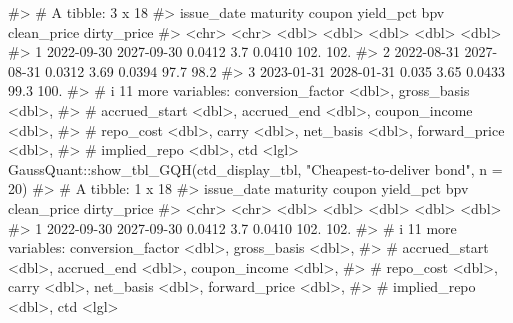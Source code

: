 \documentclass[
  letterpaper,
  DIV=11,
  numbers=noendperiod]{scrreprt}
\newenvironment{Shaded}{\begin{snugshade}}{\end{snugshade}}
\newcommand{\AttributeTok}[1]{\textcolor[rgb]{0.40,0.45,0.13}{#1}}
\newcommand{\CommentTok}[1]{\textcolor[rgb]{0.37,0.37,0.37}{#1}}
\newcommand{\DecValTok}[1]{\textcolor[rgb]{0.68,0.00,0.00}{#1}}
\newcommand{\FunctionTok}[1]{\textcolor[rgb]{0.28,0.35,0.67}{#1}}
\newcommand{\NormalTok}[1]{\textcolor[rgb]{0.00,0.23,0.31}{#1}}
\newcommand{\SpecialCharTok}[1]{\textcolor[rgb]{0.37,0.37,0.37}{#1}}
\newcommand{\StringTok}[1]{\textcolor[rgb]{0.13,0.47,0.30}{#1}}
\begin{document}
\begin{Shaded}
\begin{Highlighting}[]
\CommentTok{\#\textgreater{} \# A tibble: 3 x 18}
\CommentTok{\#\textgreater{}   issue\_date maturity   coupon yield\_pct    bpv clean\_price dirty\_price}
\CommentTok{\#\textgreater{}   \textless{}chr\textgreater{}      \textless{}chr\textgreater{}       \textless{}dbl\textgreater{}     \textless{}dbl\textgreater{}  \textless{}dbl\textgreater{}       \textless{}dbl\textgreater{}       \textless{}dbl\textgreater{}}
\CommentTok{\#\textgreater{} 1 2022{-}09{-}30 2027{-}09{-}30 0.0412      3.7  0.0410       102.        102. }
\CommentTok{\#\textgreater{} 2 2022{-}08{-}31 2027{-}08{-}31 0.0312      3.69 0.0394        97.7        98.2}
\CommentTok{\#\textgreater{} 3 2023{-}01{-}31 2028{-}01{-}31 0.035       3.65 0.0433        99.3       100. }
\CommentTok{\#\textgreater{} \# i 11 more variables: conversion\_factor \textless{}dbl\textgreater{}, gross\_basis \textless{}dbl\textgreater{},}
\CommentTok{\#\textgreater{} \#   accrued\_start \textless{}dbl\textgreater{}, accrued\_end \textless{}dbl\textgreater{}, coupon\_income \textless{}dbl\textgreater{},}
\CommentTok{\#\textgreater{} \#   repo\_cost \textless{}dbl\textgreater{}, carry \textless{}dbl\textgreater{}, net\_basis \textless{}dbl\textgreater{}, forward\_price \textless{}dbl\textgreater{},}
\CommentTok{\#\textgreater{} \#   implied\_repo \textless{}dbl\textgreater{}, ctd \textless{}lgl\textgreater{}}
\NormalTok{GaussQuant}\SpecialCharTok{::}\FunctionTok{show\_tbl\_GQH}\NormalTok{(ctd\_display\_tbl, }\StringTok{"Cheapest{-}to{-}deliver bond"}\NormalTok{, }\AttributeTok{n =} \DecValTok{20}\NormalTok{)}
\CommentTok{\#\textgreater{} \# A tibble: 1 x 18}
\CommentTok{\#\textgreater{}   issue\_date maturity   coupon yield\_pct    bpv clean\_price dirty\_price}
\CommentTok{\#\textgreater{}   \textless{}chr\textgreater{}      \textless{}chr\textgreater{}       \textless{}dbl\textgreater{}     \textless{}dbl\textgreater{}  \textless{}dbl\textgreater{}       \textless{}dbl\textgreater{}       \textless{}dbl\textgreater{}}
\CommentTok{\#\textgreater{} 1 2022{-}09{-}30 2027{-}09{-}30 0.0412       3.7 0.0410        102.        102.}
\CommentTok{\#\textgreater{} \# i 11 more variables: conversion\_factor \textless{}dbl\textgreater{}, gross\_basis \textless{}dbl\textgreater{},}
\CommentTok{\#\textgreater{} \#   accrued\_start \textless{}dbl\textgreater{}, accrued\_end \textless{}dbl\textgreater{}, coupon\_income \textless{}dbl\textgreater{},}
\CommentTok{\#\textgreater{} \#   repo\_cost \textless{}dbl\textgreater{}, carry \textless{}dbl\textgreater{}, net\_basis \textless{}dbl\textgreater{}, forward\_price \textless{}dbl\textgreater{},}
\CommentTok{\#\textgreater{} \#   implied\_repo \textless{}dbl\textgreater{}, ctd \textless{}lgl\textgreater{}}
\end{Highlighting}
\end{Shaded}
\end{document}
